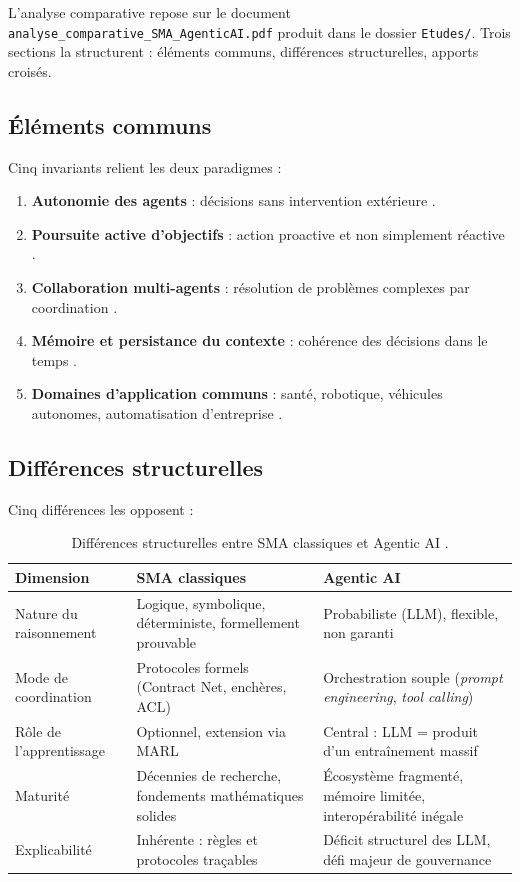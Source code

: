 L'analyse comparative repose sur le document \texttt{analyse\_comparative\_SMA\_AgenticAI.pdf} produit dans le dossier \texttt{Etudes/}. Trois sections la structurent : éléments communs, différences structurelles, apports croisés.

\subsection{Éléments communs}

Cinq invariants relient les deux paradigmes :

\begin{enumerate}
\item \textbf{Autonomie des agents} : décisions sans intervention extérieure \cite{dorri2018mas,sapkota2026}.
\item \textbf{Poursuite active d'objectifs} : action proactive et non simplement réactive \cite{sma_systemes,pati2025}.
\item \textbf{Collaboration multi-agents} : résolution de problèmes complexes par coordination \cite{sma_systemes,milosevic_rabhi}.
\item \textbf{Mémoire et persistance du contexte} : cohérence des décisions dans le temps \cite{sma_general_survey,alva_pandey}.
\item \textbf{Domaines d'application communs} : santé, robotique, véhicules autonomes, automatisation d'entreprise \cite{sma_wjarr,hughes2025,abouali2026}.
\end{enumerate}

\subsection{Différences structurelles}

Cinq différences les opposent :

\begin{table}[H]
\centering
\small
\begin{tabularx}{\textwidth}{@{}lXX@{}}
\toprule
\textbf{Dimension} & \textbf{SMA classiques} & \textbf{Agentic AI} \\
\midrule
Nature du raisonnement & Logique, symbolique, déterministe, formellement prouvable & Probabiliste (LLM), flexible, non garanti \\
Mode de coordination & Protocoles formels (Contract Net, enchères, ACL) & Orchestration souple (\emph{prompt engineering}, \emph{tool calling}) \\
Rôle de l'apprentissage & Optionnel, extension via MARL & Central : LLM = produit d'un entraînement massif \\
Maturité & Décennies de recherche, fondements mathématiques solides & Écosystème fragmenté, mémoire limitée, interopérabilité inégale \\
Explicabilité & Inhérente : règles et protocoles traçables & Déficit structurel des LLM, défi majeur de gouvernance \\
\bottomrule
\end{tabularx}
\caption{Différences structurelles entre SMA classiques et Agentic AI \cite{abouali2026,sma_general_survey,schneider2025,vaidhyanathan_taibi}.}
\end{table}

